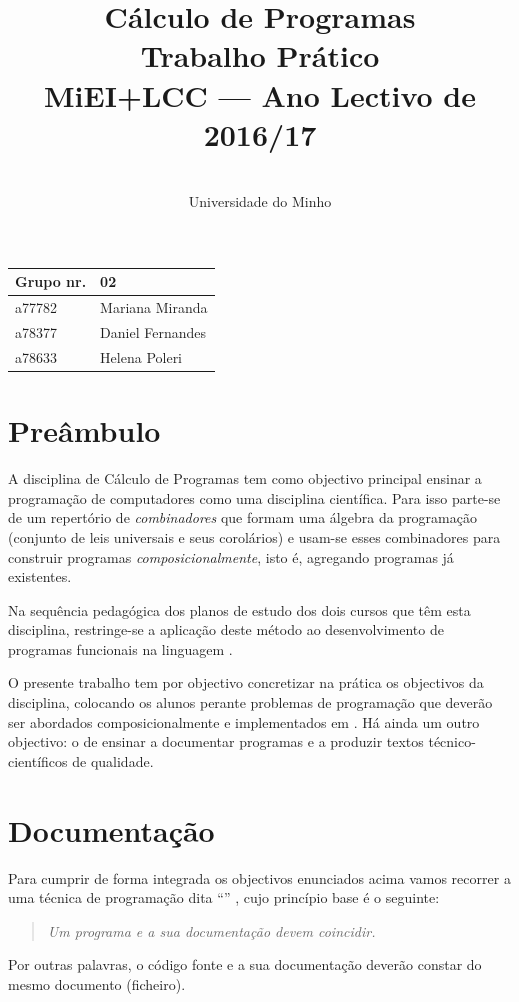 \documentclass[a4paper]{article}
\title{
       	    Cálculo de Programas
\\
       	Trabalho Prático
\\
       	MiEI+LCC --- Ano Lectivo de 2016/17
}
\author{
       	\dium
\\
       	Universidade do Minho
}
\date\mydate
\begin{document}
\maketitle

\begin{center}\large
\begin{tabular}{ll}
\textbf{Grupo} nr. & 02
\\\hline
a77782 & Mariana Miranda
\\
a78377 & Daniel Fernandes
\\
a78633 & Helena Poleri
\end{tabular}
\end{center}

\tableofcontents

\newpage

\section{Preâmbulo}

A disciplina de Cálculo de Programas tem como objectivo principal ensinar
a progra\-mação de computadores como uma disciplina científica. Para isso
parte-se de um repertório de \emph{combinadores} que formam uma álgebra da
programação (conjunto de leis universais e seus corolários) e usam-se esses
combinadores para construir programas \emph{composicionalmente}, isto é,
agregando programas já existentes.
  
Na sequência pedagógica dos planos de estudo dos dois cursos que têm esta
disciplina, restringe-se a aplicação deste método ao desenvolvimento de programas
funcionais na linguagem \Haskell.

O presente trabalho tem por objectivo concretizar na prática os objectivos
da disciplina, colocando os alunos perante problemas de programação que
deverão ser abordados composicionalmente e implementados em \Haskell.
Há ainda um outro objectivo: o de ensinar a documentar programas e
a produzir textos técnico-científicos de qualidade.

\section{Documentação}
Para cumprir de forma integrada os objectivos enunciados acima vamos recorrer
a uma técnica de programa\-ção dita ``'' \cite{Kn92}, cujo
princípio base é o seguinte:
\begin{quote}\em
Um programa e a sua documentação devem coincidir.
\end{quote}
Por outras palavras, o código fonte e a sua documentação deverão constar
do mesmo documento (ficheiro).
\end{document}

